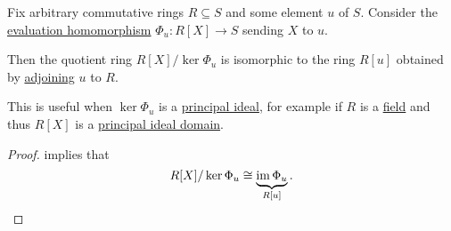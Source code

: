\begin{proposition}\label{thm:adjoint_roots_and_quotients}
  Fix arbitrary commutative rings \( R \subseteq S \) and some element \( u \) of \( S \). Consider the \hyperref[rem:substitution_homomorphism]{evaluation homomorphism} \( \Phi_u: R[X] \to S \) sending \( X \) to \( u \).

  Then the quotient ring \( R[X] / \ker \Phi_u \) is isomorphic to the ring \( R[u] \) obtained by \hyperref[thm:adjoining_elements_to_semiring]{adjoining} \( u \) to \( R \).
\end{proposition}
\begin{comments}
  \item This is useful when \( \ker \Phi_u \) is a \hyperref[def:semiring_ideal/principal]{principal ideal}, for example if \( R \) is a \hyperref[def:field]{field} and thus \( R[X] \) is a \hyperref[def:principal_ideal_domain]{principal ideal domain}.
\end{comments}
\begin{proof}
   implies that
  \begin{equation*}
    R[X] / \ker \Phi_u \cong \underbrace{\operatorname{im} \Phi_u}_{R[u]}.
  \end{equation*}
\end{proof}

